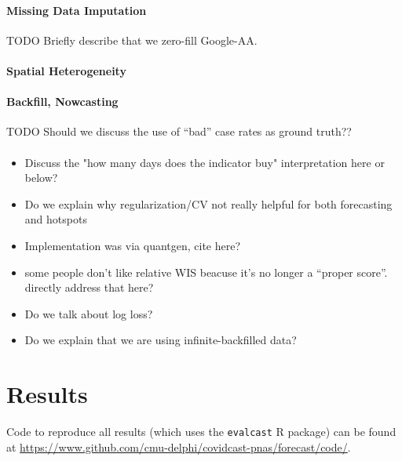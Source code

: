 \documentclass[9pt,twocolumn,twoside,lineno]{pnas-new}
\begin{document}
\paragraph{Missing Data Imputation}

TODO Briefly describe that we zero-fill Google-AA.

\paragraph{Spatial Heterogeneity}

\paragraph{Backfill, Nowcasting}

TODO Should we discuss the use of ``bad'' case rates as ground truth?? 

\paragraph{}

\begin{itemize}
\item Discuss the "how many days does the indicator buy" interpretation here or below? 


\item Do we explain why regularization/CV not really helpful for both
forecasting and hotspots


\item Implementation was via quantgen, cite here?

\item some people don't like relative WIS beacuse it's no longer a
``proper score''.  directly address that here?


\item Do we talk about log loss?

\item Do we explain that we are using infinite-backfilled data?


\end{itemize}



\section{Results}

Code to reproduce all results (which uses the \texttt{evalcast} R package) can 
be found at
\url{https://www.github.com/cmu-delphi/covidcast-pnas/forecast/code/}. 
\end{document}
